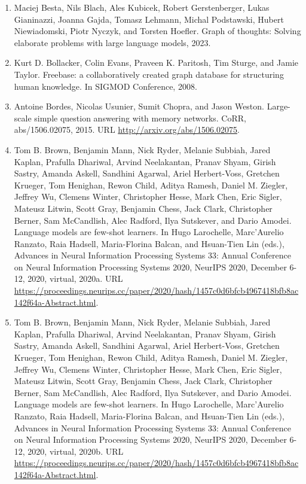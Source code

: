 \documentclass[11pt,UTF8,fontset=fandol]{ctexart}
\begin{document}
\begin{enumerate}[leftmargin=2em]
\item Maciej Besta, Nils Blach, Ales Kubicek, Robert Gerstenberger, Lukas Gianinazzi, Joanna Gajda, Tomasz Lehmann, Michal Podstawski, Hubert Niewiadomski, Piotr Nyczyk, and Torsten Hoefler. Graph of thoughts: Solving elaborate problems with large language models, 2023.
\item Kurt D. Bollacker, Colin Evans, Praveen K. Paritosh, Tim Sturge, and Jamie Taylor. Freebase: a collaboratively created graph database for structuring human knowledge. In SIGMOD Conference, 2008.
\item Antoine Bordes, Nicolas Usunier, Sumit Chopra, and Jason Weston. Large-scale simple question answering with memory networks. CoRR, abs/1506.02075, 2015. URL \url{http://arxiv.org/abs/1506.02075}.
\item Tom B. Brown, Benjamin Mann, Nick Ryder, Melanie Subbiah, Jared Kaplan, Prafulla Dhariwal, Arvind Neelakantan, Pranav Shyam, Girish Sastry, Amanda Askell, Sandhini Agarwal, Ariel Herbert-Voss, Gretchen Krueger, Tom Henighan, Rewon Child, Aditya Ramesh, Daniel M. Ziegler, Jeffrey Wu, Clemens Winter, Christopher Hesse, Mark Chen, Eric Sigler, Mateusz Litwin, Scott Gray, Benjamin Chess, Jack Clark, Christopher Berner, Sam McCandlish, Alec Radford, Ilya Sutskever, and Dario Amodei. Language models are few-shot learners. In Hugo Larochelle, Marc'Aurelio Ranzato, Raia Hadsell, Maria-Florina Balcan, and Hsuan-Tien Lin (eds.), Advances in Neural Information Processing Systems 33: Annual Conference on Neural Information Processing Systems 2020, NeurIPS 2020, December 6-12, 2020, virtual, 2020a. URL \url{https://proceedings.neurips.cc/paper/2020/hash/1457c0d6bfcb4967418bfb8ac142f64a-Abstract.html}.
\item Tom B. Brown, Benjamin Mann, Nick Ryder, Melanie Subbiah, Jared Kaplan, Prafulla Dhariwal, Arvind Neelakantan, Pranav Shyam, Girish Sastry, Amanda Askell, Sandhini Agarwal, Ariel Herbert-Voss, Gretchen Krueger, Tom Henighan, Rewon Child, Aditya Ramesh, Daniel M. Ziegler, Jeffrey Wu, Clemens Winter, Christopher Hesse, Mark Chen, Eric Sigler, Mateusz Litwin, Scott Gray, Benjamin Chess, Jack Clark, Christopher Berner, Sam McCandlish, Alec Radford, Ilya Sutskever, and Dario Amodei. Language models are few-shot learners. In Hugo Larochelle, Marc'Aurelio Ranzato, Raia Hadsell, Maria-Florina Balcan, and Hsuan-Tien Lin (eds.), Advances in Neural Information Processing Systems 33: Annual Conference on Neural Information Processing Systems 2020, NeurIPS 2020, December 6-12, 2020, virtual, 2020b. URL \url{https://proceedings.neurips.cc/paper/2020/hash/1457c0d6bfcb4967418bfb8ac142f64a-Abstract.html}.

\end{enumerate}
\end{document}
